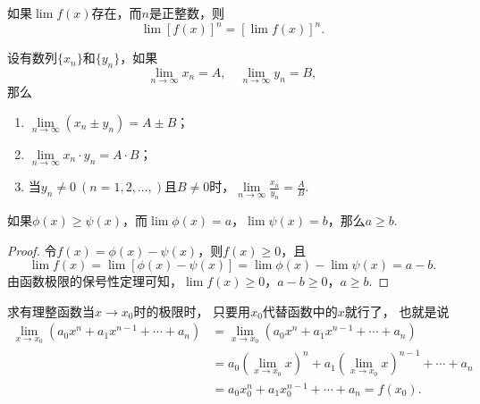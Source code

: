 \begin{corollary}
如果\(\lim f(x)\)存在，而\(n\)是正整数，则\[\lim [f(x)]^n = [\lim f(x)]^n.\]
\end{corollary}

\begin{theorem}
设有数列\(\{x_n\}\)和\(\{y_n\}\)，如果\[
\lim\limits_{n\to\infty}x_n = A,
\quad
\lim\limits_{n\to\infty}y_n = B,
\]那么\begin{enumerate}
\item \(\lim\limits_{n\to\infty}{(x_n \pm y_n)}=A \pm B\)；
\item \(\lim\limits_{n\to\infty}{x_n \cdot y_n}=A \cdot B\)；
\item 当\(y_n \neq 0\ (n=1,2,\dotsc,)\)且\(B \neq 0\)时，\(\lim\limits_{n\to\infty}{\frac{x_n}{y_n}}=\frac{A}{B}\).
\end{enumerate}
\end{theorem}

\begin{theorem}
如果\(\phi(x) \geq \psi(x)\)，而\(\lim \phi(x)=a\)，\(\lim \psi(x)=b\)，那么\(a \geq b\).
\begin{proof}
令\(f(x) = \phi(x) - \psi(x)\)，则\(f(x) \geq 0\)，且\[
\lim f(x) = \lim[\phi(x) - \psi(x)]
= \lim \phi(x) - \lim \psi(x)
= a - b.
\]由函数极限的保号性定理可知，\(\lim f(x) \geq 0\)，\(a - b \geq 0\)，\(a \geq b\).
\end{proof}
\end{theorem}

\begin{example}\label{example:极限.有理整函数在一点的极限}
求有理整函数当\(x\to x_0\)时的极限时，
只要用\(x_0\)代替函数中的\(x\)就行了，
也就是说
\def\lx{\left(\lim\limits_{x \to x_0} x\right)}
\begin{align*}
	\lim\limits_{x \to x_0} (a_0 x^n + a_1 x^{n-1} + \dotsb + a_n)
	&= \lim\limits_{x \to x_0}{(a_0 x^n + a_1 x^{n-1} + \dotsb + a_n)} \\
	&= a_0 \lx^n + a_1 \lx^{n-1} + \dotsb + a_n \\
	&= a_0 x_0^n + a_1 x_0^{n-1} + \dotsb + a_n
	= f(x_0).
\end{align*}
\end{example}

